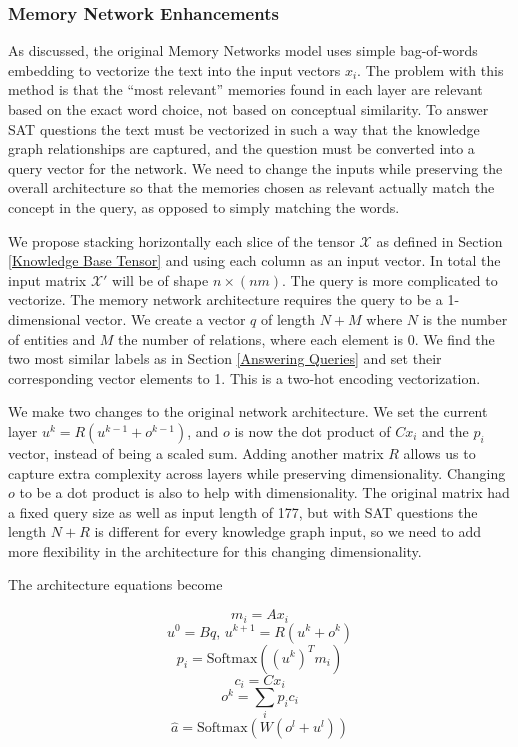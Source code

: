 \documentclass[pageno]{final_paper}
\begin{document}
\subsubsection{Memory Network Enhancements}
\label{Memory Network Enhancements}

As discussed, the original Memory Networks model uses simple bag-of-words
embedding to vectorize the text into the input vectors ${x_i}$. The problem with
this method is that the ``most relevant'' memories found in each layer are
relevant based on the exact word choice, not based on conceptual similarity. To
answer SAT questions the text must be vectorized in such a way that the
knowledge graph relationships are captured, and the question must be converted
into a query vector for the network. We need to change the inputs while
preserving the overall architecture so that the memories chosen as relevant
actually match the concept in the query, as opposed to simply matching the
words.

We propose stacking horizontally each slice of the tensor $\mathcal{X}$ as
defined in Section \ref{Knowledge Base Tensor} and using each column as an input
vector. In total the input matrix $\mathcal{X}'$ will be of shape $n\times
(nm)$. The query is more complicated to vectorize. The memory network
architecture requires the query to be a 1-dimensional vector. We create a vector
$q$ of length $N+M$ where $N$ is the number of entities and $M$ the number of
relations, where each element is 0. We find the two most similar labels as in
Section \ref{Answering Queries} and set their corresponding vector elements to
1. This is a two-hot encoding vectorization.

We make two changes to the original network architecture. We set the current
layer $u^k = R(u^{k-1} + o^{k-1})$, and $o$ is now the dot product of $Cx_i$ and
the $p_i$ vector, instead of being a scaled sum. Adding another matrix $R$
allows us to capture extra complexity across layers while preserving
dimensionality. Changing $o$ to be a dot product is also to help with
dimensionality. The original matrix had a fixed query size as well as input
length of 177, but with SAT questions the length $N+R$ is different for every
knowledge graph input, so we need to add more flexibility in the architecture
for this changing dimensionality.

The architecture equations become

$$m_i = Ax_i$$
$$u^0 = Bq,\, u^{k+1} = R(u^k + o^k)$$
$$p_i = \text{Softmax}\left(\left(u^k\right)^Tm_i\right)$$
$$c_i = Cx_i$$
$$o^k = \sum_i p_ic_i$$
$$\hat{a} = \text{Softmax}\left(W\left(o^l+u^l\right)\right)$$
\end{document}
